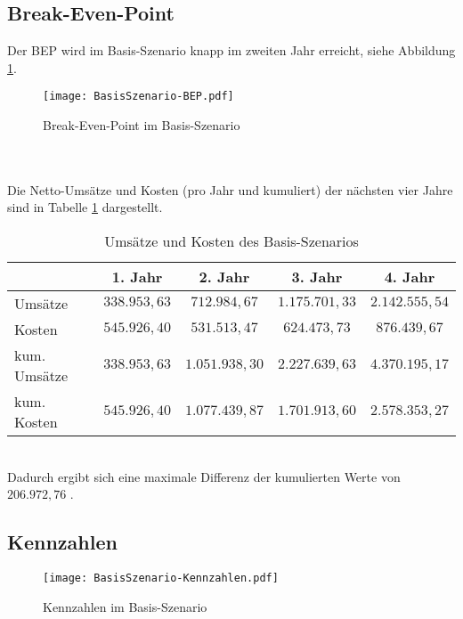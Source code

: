 \subsection{Break-Even-Point}
\label{sec:BasisSzenario-BEP}
Der BEP wird im Basis-Szenario knapp im zweiten Jahr erreicht, siehe Abbildung \ref{fig:BasisSzenario-BEP}.
\begin{figure}[h]
	\centering
	\texttt{[image: BasisSzenario-BEP.pdf]}
	\caption{Break-Even-Point im Basis-Szenario}
	\label{fig:BasisSzenario-BEP}
\end{figure}\\
\\Die Netto-Umsätze und Kosten (pro Jahr und kumuliert) der nächsten vier Jahre sind in Tabelle \ref{tab:BasisSzenario-BEP} dargestellt.
\begin{table}[h]
	\centering
	\begin{tabular}{|l|c|c|c|c|}
		\hline 
		& 1. Jahr & 2. Jahr & 3. Jahr & 4. Jahr \\ 
		\hline 
		Umsätze & $338.953,63$ \officialeuro & $712.984,67$ \officialeuro & $1.175.701,33$ \officialeuro & $2.142.555,54$ \officialeuro \\
		\hline 
		Kosten & $545.926,40$ \officialeuro & $531.513,47$ \officialeuro & $624.473,73$ \officialeuro & $876.439,67$ \officialeuro \\		
		\hline 
		kum. Umsätze & $338.953,63$ \officialeuro & $1.051.938,30$ \officialeuro & $2.227.639,63$ \officialeuro & $4.370.195,17$ \officialeuro \\		
		\hline 
		kum. Kosten & $545.926,40$ \officialeuro & $1.077.439,87$ \officialeuro & $1.701.913,60$ \officialeuro & $2.578.353,27$ \officialeuro \\		
		\hline 
	\end{tabular}
	\caption{Umsätze und Kosten des Basis-Szenarios}
	\label{tab:BasisSzenario-BEP} 
\end{table}\\
Dadurch ergibt sich eine maximale Differenz der kumulierten Werte von $206.972,76$ \officialeuro.

\newpage
\subsection{Kennzahlen}
\begin{figure}[h]
	\centering
	\texttt{[image: BasisSzenario-Kennzahlen.pdf]}
	\caption{Kennzahlen im Basis-Szenario}
	\label{fig:BasisSzenario-Kennzahlen}
\end{figure}
\newpage
